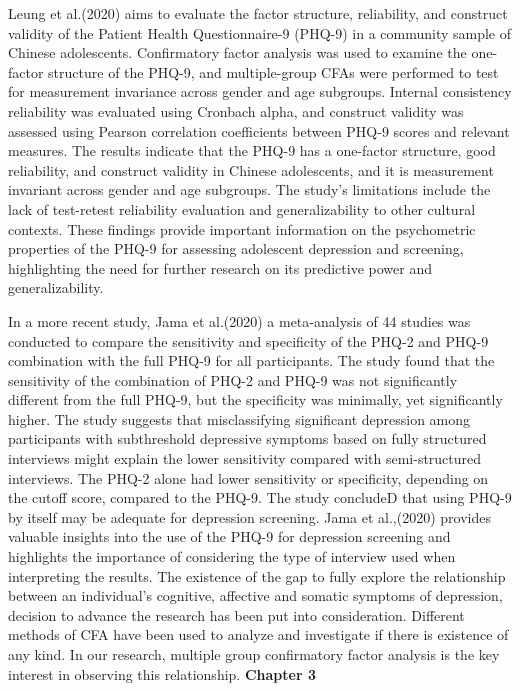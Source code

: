 \documentclass[12pt]{article}
\begin{document}
Leung et al.(2020) aims to evaluate the factor structure, reliability, and construct validity of the Patient Health Questionnaire-9 (PHQ-9) in a community sample of Chinese adolescents. Confirmatory factor analysis was used to examine the one-factor structure of the PHQ-9, and multiple-group CFAs were performed to test for measurement invariance across gender and age subgroups. Internal consistency reliability was evaluated using Cronbach alpha, and construct validity was assessed using Pearson correlation coefficients between PHQ-9 scores and relevant measures. The results indicate that the PHQ-9 has a one-factor structure, good reliability, and construct validity in Chinese adolescents, and it is measurement invariant across gender and age subgroups. The study's limitations include the lack of test-retest reliability evaluation and generalizability to other cultural contexts. These findings provide important information on the psychometric properties of the PHQ-9 for assessing adolescent depression and screening, highlighting the need for further research on its predictive power and generalizability.

In a more recent study, Jama et al.(2020) a meta-analysis of 44 studies was conducted to compare the sensitivity and specificity of the PHQ-2 and PHQ-9 combination with the full PHQ-9 for all participants. The study found that the sensitivity of the combination of PHQ-2 and PHQ-9 was not significantly different from the full PHQ-9, but the specificity was minimally, yet significantly higher. The study suggests that misclassifying significant depression among participants with subthreshold depressive symptoms based on fully structured interviews might explain the lower sensitivity compared with semi-structured interviews. The PHQ-2 alone had lower sensitivity or specificity, depending on the cutoff score, compared to the PHQ-9. The study concludeD that using PHQ-9 by itself may be adequate for depression screening. Jama et al.,(2020) provides valuable insights into the use of the PHQ-9 for depression screening and highlights the importance of considering the type of interview used when interpreting the results. The existence of the gap to fully explore the relationship between an individual's cognitive, affective and somatic symptoms of depression, decision to advance the research has been put into consideration. Different methods of CFA have been used to analyze and investigate if there is existence of any kind. In our research, multiple group confirmatory factor analysis is the key interest in observing this relationship.
\newpage
\textbf{Chapter 3}
\end{document}
